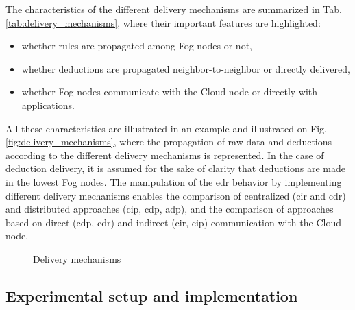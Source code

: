 \documentclass{iosart2c}
\begin{document}
The characteristics of the different delivery mechanisms are summarized in Tab. \ref{tab:delivery_mechanisms}, where their important features are highlighted: 
\begin{itemize}
	\item whether rules are propagated among Fog nodes or not,
	\item whether deductions are propagated neighbor-to-neighbor or directly delivered,
	\item whether Fog nodes communicate with the Cloud node or directly with applications. 
\end{itemize}  

	

All these characteristics are illustrated in an example and illustrated on Fig. \ref{fig:delivery_mechanisms}, where the propagation of raw data and deductions according to the different delivery mechanisms is represented. 
In the case of deduction delivery, it is assumed for the sake of clarity that deductions are made in the lowest Fog nodes. 
The manipulation of the \gls{edr} behavior by implementing different delivery mechanisms enables the comparison of centralized (\gls{cir} and \gls{cdr}) and distributed approaches (\gls{cip}, \gls{cdp}, \gls{adp}), and the comparison of approaches based on direct (\gls{cdp}, \gls{cdr}) and indirect (\gls{cir}, \gls{cip}) communication with the Cloud node. 

\begin{figure}
	\centering
	\caption{Delivery mechanisms}
	\scalebox{0.8}{
		
		\label{fig:delivery_mechanisms}	
	}
\end{figure}


\subsection{Experimental setup and implementation}
\label{sec:setup}
\end{document}
